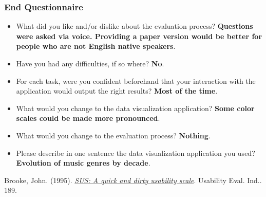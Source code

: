 \documentclass[twocolumn, letterpaper,13pt]{scrartcl}
\begin{document}
    \subsubsection*{End Questionnaire}
    \begin{itemize}
        \item What did you like and/or dislike about the evaluation process? \textbf{Questions were asked via voice. Providing a paper version would be better for people who are not English native speakers}.
        \item Have you had any difficulties, if so where? \textbf{No}.
        \item For each task, were you confident beforehand that your interaction with the application would output the right results? \textbf{Most of the time}.
        \item What would you change to the data visualization application? \textbf{Some color scales could be made more pronounced}. 
        \item What would you change to the evaluation process? \textbf{Nothing}.
        \item Please describe in one sentence the data visualization application you used? \textbf{Evolution of music genres by decade}.
    \end{itemize}
    
       
    \begin{thebibliography}{9}

    Brooke, John. (1995). \textit{\href{https://hell.meiert.org/core/pdf/sus.pdf}{SUS: A quick and dirty usability scale}}. Usability Eval. Ind.. 189. 

    \end{thebibliography}
    
\end{document}
